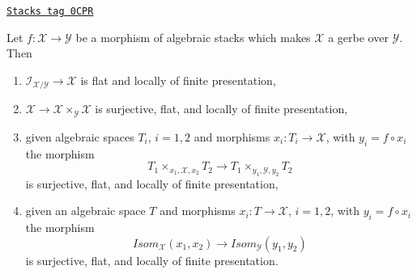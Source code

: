 \begin{lemma}
\label{stacks-morphisms-lemma-gerbe-isom-fppf}
\href{https://stacks.math.columbia.edu/tag/0CPR}{\texttt{Stacks tag 0CPR}}

Let $f : \mathcal{X} \to \mathcal{Y}$ be a morphism of algebraic stacks
which makes $\mathcal{X}$ a gerbe over $\mathcal{Y}$. Then
\begin{enumerate}
\item $\mathcal{I}_{\mathcal{X}/\mathcal{Y}} \to \mathcal{X}$
is flat and locally of finite presentation,
\item $\mathcal{X} \to \mathcal{X} \times_\mathcal{Y} \mathcal{X}$
is surjective, flat, and locally of finite presentation,
\item given algebraic spaces $T_i$, $i = 1, 2$ and morphisms
$x_i : T_i \to \mathcal{X}$, with $y_i = f \circ x_i$ the morphism
$$
T_1 \times_{x_1, \mathcal{X}, x_2} T_2 \longrightarrow
T_1 \times_{y_1, \mathcal{Y}, y_2} T_2
$$
is surjective, flat, and locally of finite presentation,
\item given an algebraic space $T$ and morphisms
$x_i : T \to \mathcal{X}$, $i = 1, 2$, with $y_i = f \circ x_i$ the morphism
$$
\mathit{Isom}_\mathcal{X}(x_1, x_2) \longrightarrow
\mathit{Isom}_\mathcal{Y}(y_1, y_2)
$$
is surjective, flat, and locally of finite presentation.
\end{enumerate}
\end{lemma}

